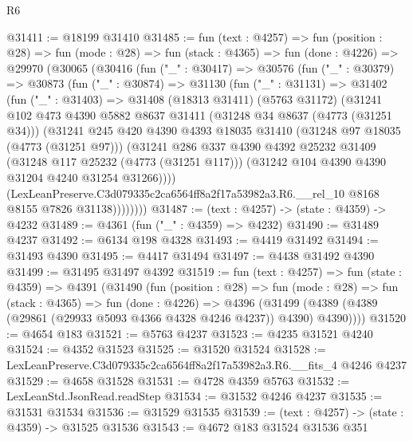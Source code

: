 \begin{lexlean}{R6}
\begin{coremodule}
@31411 := @18199 @31410
@31485 := fun (text : @4257) =>
  fun (position : @28) =>
  fun (mode : @28) =>
  fun (stack : @4365) =>
  fun (done : @4226) =>
  @29970
    (@30065
      (@30416
        (fun ("_" : @30417) =>
        @30576
          (fun ("_" : @30379) =>
          @30873
            (fun ("_" : @30874) =>
            @31130
              (fun ("_" : @31131) =>
              @31402
                (fun ("_" : @31403) =>
                @31408
                  (@18313 @31411)
                  (@5763 @31172)
                  (@31241
                    @102
                    @473
                    @4390
                    @5882
                    @8637
                    @31411
                    (@31248 @34 @8637 (@4773 (@31251 @34)))
                    (@31241
                      @245
                      @420
                      @4390
                      @4393
                      @18035
                      @31410
                      (@31248 @97 @18035 (@4773 (@31251 @97)))
                      (@31241
                        @286
                        @337
                        @4390
                        @4392
                        @25232
                        @31409
                        (@31248 @117 @25232 (@4773 (@31251 @117)))
                        (@31242 @104 @4390 @4390 @31204 @4240 @31254 @31266))))
                  (LexLeanPreserve.C3d079335c2ca6564ff8a2f17a53982a3.R6.__rel_10
                    @8168
                    @8155
                    @7826
                    @31138))))))))
@31487 := (text : @4257) -> (state : @4359) -> @4232
@31489 := @4361 (fun ("_" : @4359) => @4232)
@31490 := @31489 @4237
@31492 := @6134 @198 @4328
@31493 := @4419 @31492
@31494 := @31493 @4390
@31495 := @4417 @31494
@31497 := @4438 @31492 @4390
@31499 := @31495 @31497 @4392
@31519 := fun (text : @4257) =>
  fun (state : @4359) =>
  @4391
    (@31490
      (fun (position : @28) =>
      fun (mode : @28) =>
      fun (stack : @4365) =>
      fun (done : @4226) =>
      @4396 (@31499 (@4389 (@4389 (@29861 (@29933 @5093 @4366 @4328 @4246 @4237)) @4390) @4390))))
@31520 := @4654 @183
@31521 := @5763 @4237
@31523 := @4235 @31521 @4240
@31524 := @4352 @31523
@31525 := @31520 @31524
@31528 := LexLeanPreserve.C3d079335c2ca6564ff8a2f17a53982a3.R6.__fits_4 @4246 @4237
@31529 := @4658 @31528
@31531 := @4728 @4359 @5763
@31532 := LexLeanStd.JsonRead.readStep
@31534 := @31532 @4246 @4237
@31535 := @31531 @31534
@31536 := @31529 @31535
@31539 := (text : @4257) -> (state : @4359) -> @31525 @31536
@31543 := @4672 @183 @31524 @31536 @351

\end{coremodule}
\end{lexlean}

